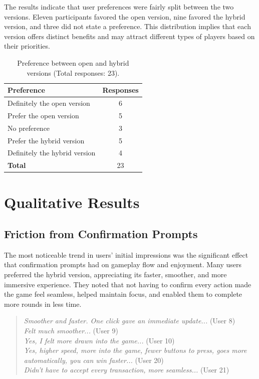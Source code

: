 \documentclass[10pt,conference]{IEEEtran}
\begin{document}
The results indicate that user preferences were fairly split between the two versions. Eleven participants favored the open version, nine favored the hybrid version, and three did not state a preference. This distribution implies that each version offers distinct benefits and may attract different types of players based on their priorities.

\begin{table}[h!]
\centering
\caption{Preference between open and hybrid versions (Total responses: 23).}
\begin{tabular}{l c}
\hline
\textbf{Preference} & \textbf{Responses} \\
\hline
Definitely the open version   & 6 \\
Prefer the open version       & 5 \\
No preference                 & 3 \\
Prefer the hybrid version     & 5 \\
Definitely the hybrid version & 4 \\
\hline
\textbf{Total} & 23 \\
\hline
\end{tabular}
\end{table}


\section{Qualitative Results}\label{sec:qual}

\subsection{Friction from Confirmation Prompts}
The most noticeable trend in users’ initial impressions was the significant effect that confirmation prompts had on gameplay flow and enjoyment. Many users preferred the hybrid version, appreciating its faster, smoother, and more immersive experience. They noted that not having to confirm every action made the game feel seamless, helped maintain focus, and enabled them to complete more rounds in less time.

\begin{quote}
\textit{Smoother and faster. One click gave an immediate update...} (User 8)\\
\textit{Felt much smoother...} (User 9)\\
\textit{Yes, I felt more drawn into the game...} (User 10)\\
\textit{Yes, higher speed, more into the game, fewer buttons to press, goes more automatically, you can win faster...} (User 20)\\
\textit{Didn’t have to accept every transaction, more seamless...} (User 21)
\end{quote}
\end{document}
